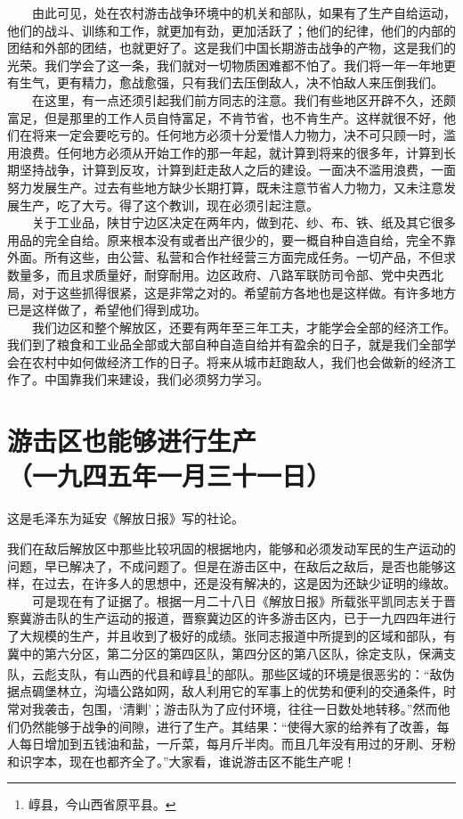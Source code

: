 \documentclass[cn,11pt,chinese]{elegantbook}
\def\myformat#1{\hfil\hfil #1}
\begin{document}
　　由此可见，处在农村游击战争环境中的机关和部队，如果有了生产自给运动，他们的战斗、训练和工作，就更加有劲，更加活跃了；他们的纪律，他们的内部的团结和外部的团结，也就更好了。这是我们中国长期游击战争的产物，这是我们的光荣。我们学会了这一条，我们就对一切物质困难都不怕了。我们将一年一年地更有生气，更有精力，愈战愈强，只有我们去压倒敌人，决不怕敌人来压倒我们。\\
　　在这里，有一点还须引起我们前方同志的注意。我们有些地区开辟不久，还颇富足，但是那里的工作人员自恃富足，不肯节省，也不肯生产。这样就很不好，他们在将来一定会要吃亏的。任何地方必须十分爱惜人力物力，决不可只顾一时，滥用浪费。任何地方必须从开始工作的那一年起，就计算到将来的很多年，计算到长期坚持战争，计算到反攻，计算到赶走敌人之后的建设。一面决不滥用浪费，一面努力发展生产。过去有些地方缺少长期打算，既未注意节省人力物力，又未注意发展生产，吃了大亏。得了这个教训，现在必须引起注意。\\
　　关于工业品，陕甘宁边区决定在两年内，做到花、纱、布、铁、纸及其它很多用品的完全自给。原来根本没有或者出产很少的，要一概自种自造自给，完全不靠外面。所有这些，由公营、私营和合作社经营三方面完成任务。一切产品，不但求数量多，而且求质量好，耐穿耐用。边区政府、八路军联防司令部、党中央西北局，对于这些抓得很紧，这是非常之对的。希望前方各地也是这样做。有许多地方已是这样做了，希望他们得到成功。\\
　　我们边区和整个解放区，还要有两年至三年工夫，才能学会全部的经济工作。我们到了粮食和工业品全部或大部自种自造自给并有盈余的日子，就是我们全部学会在农村中如何做经济工作的日子。将来从城市赶跑敌人，我们也会做新的经济工作了。中国靠我们来建设，我们必须努力学习。\\
\newpage\section*{\myformat{游击区也能够进行生产}\\\myformat{（一九四五年一月三十一日）}}
\begin{introduction}\item  这是毛泽东为延安《解放日报》写的社论。\end{introduction}
我们在敌后解放区中那些比较巩固的根据地内，能够和必须发动军民的生产运动的问题，早已解决了，不成问题了。但是在游击区中，在敌后之敌后，是否也能够这样，在过去，在许多人的思想中，还是没有解决的，这是因为还缺少证明的缘故。\\
　　可是现在有了证据了。根据一月二十八日《解放日报》所载张平凯同志关于晋察冀游击队的生产运动的报道，晋察冀边区的许多游击区内，已于一九四四年进行了大规模的生产，并且收到了极好的成绩。张同志报道中所提到的区域和部队，有冀中的第六分区，第二分区的第四区队，第四分区的第八区队，徐定支队，保满支队，云彪支队，有山西的代县和崞县\footnote[1]{ 崞县，今山西省原平县。}的部队。那些区域的环境是很恶劣的：“敌伪据点碉堡林立，沟墙公路如网，敌人利用它的军事上的优势和便利的交通条件，时常对我袭击，包围，‘清剿’；游击队为了应付环境，往往一日数处地转移。”然而他们仍然能够于战争的间隙，进行了生产。其结果：“使得大家的给养有了改善，每人每日增加到五钱油和盐，一斤菜，每月斤半肉。而且几年没有用过的牙刷、牙粉和识字本，现在也都齐全了。”大家看，谁说游击区不能生产呢！\\
\end{document}
